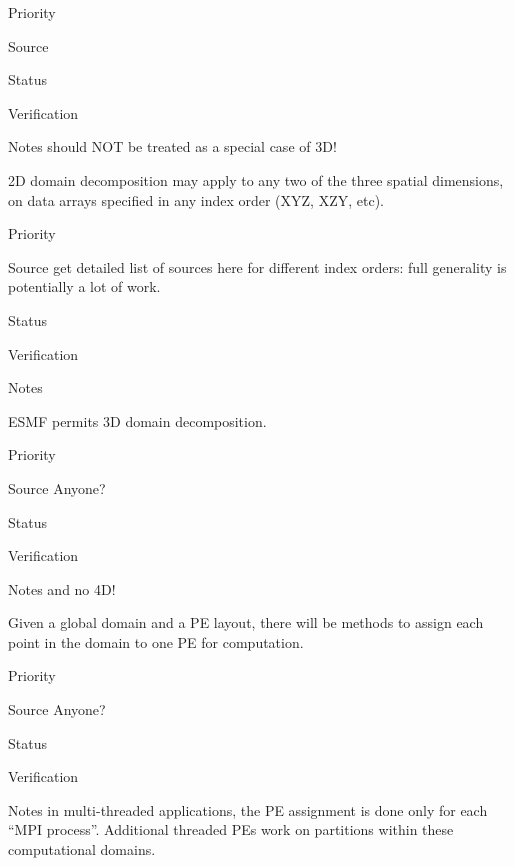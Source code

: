 \begin{reqlist}
\item[Priority]
\item[Source]
\item[Status]
\item[Verification]
\item[Notes] should NOT be treated as a special case of 3D!
\end{reqlist}


2D domain decomposition may apply to any two of the three spatial
dimensions, on data arrays specified in any index order (XYZ, XZY,
etc).

\begin{reqlist}
\item[Priority]
\item[Source] get detailed list of sources here for different index
  orders: full generality is potentially a lot of work.
\item[Status]
\item[Verification]
\item[Notes]
\end{reqlist}


ESMF permits 3D domain decomposition.

\begin{reqlist}
\item[Priority]
\item[Source] Anyone?
\item[Status]
\item[Verification]
\item[Notes] and no 4D!
\end{reqlist}


Given a global domain and a PE layout, there will be methods to assign
each point in the domain to one PE for computation. 

\begin{reqlist}
\item[Priority]
\item[Source] Anyone?
\item[Status]
\item[Verification]
\item[Notes] in multi-threaded applications, the PE assignment is done
  only for each ``MPI process''. Additional threaded PEs work on
  partitions within these computational domains.
\end{reqlist}

